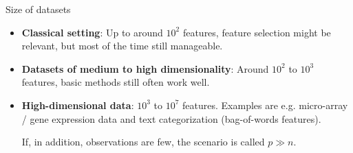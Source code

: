 \begin{vbframe}{Size of datasets}
\begin{itemize}
  \item \textbf{Classical setting}: Up to around $10^2$ features,
    feature selection might be relevant, but most of the time still manageable.
  \item \textbf{Datasets of medium to high dimensionality}:
    Around $10^2$ to $10^3$ features, basic methods still often work well.
  \item \textbf{High-dimensional data}: $10^3$ to $10^7$ features.
    Examples are e.g. micro-array / gene expression data and text categorization (bag-of-words features).

    If, in addition, observations are few, the scenario is called $p \gg n$.
\end{itemize}

\end{vbframe}


